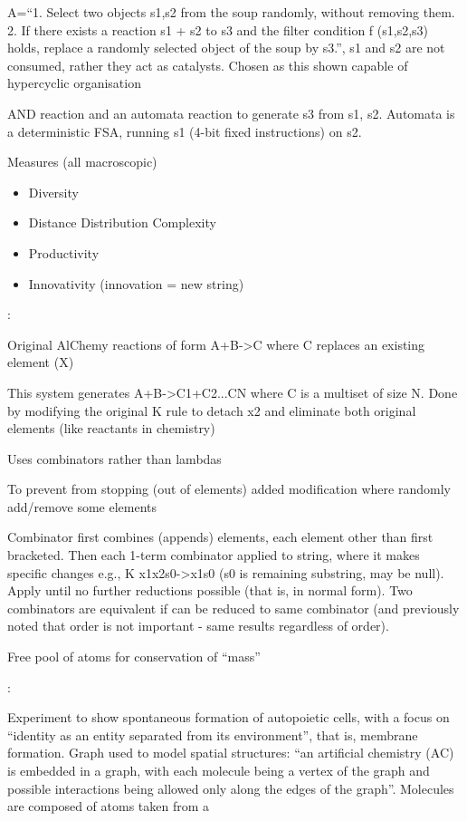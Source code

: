 A=``1. Select two objects s1,s2 from the soup randomly, without removing them. 2. If there exists a reaction s1 + s2 to s3 and the filter condition f (s1,s2,s3) holds, replace a randomly selected object of the soup by s3.'', s1 and s2 are not consumed, rather they act as catalysts. Chosen as this shown capable of hypercyclic organisation

AND reaction and an automata reaction to generate s3 from s1, s2. Automata is a deterministic FSA, running s1 (4-bit fixed instructions) on s2.

Measures (all macroscopic)

\begin{itemize}
	\item Diversity
	\item Distance Distribution Complexity
	\item Productivity
	\item Innovativity (innovation = new string)
\end{itemize}

\parencite{Fenizio2000}:

Original AlChemy reactions of form A+B-\textgreater{}C where C replaces an existing element (X)

This system generates A+B-\textgreater{}C1+C2...CN where C is a multiset of size N. Done by modifying the original K rule to detach x2 and eliminate both original elements (like reactants in chemistry)

Uses combinators rather than lambdas

To prevent from stopping (out of elements) added modification where randomly add/remove some elements

Combinator first combines (appends) elements, each element other than first bracketed. Then each 1-term combinator applied to string, where it makes specific changes e.g., K x1x2s0-\textgreater{}x1s0 (s0 is remaining substring, may be null). Apply until no further reductions possible (that is, in normal form). Two combinators are equivalent if can be reduced to same combinator (and previously noted that order is not important - same results regardless of order).

Free pool of atoms for conservation of ``mass''

\parencite{Fenizio2001}:

Experiment to show spontaneous formation of autopoietic cells, with a focus on ``identity as an entity separated from its environment'', that is, membrane formation. Graph used to model spatial structures: ``an artificial chemistry (AC) is embedded in a graph, with each molecule being a vertex of the graph and possible interactions being allowed only along the edges of the graph''. Molecules are composed of atoms taken from a 

